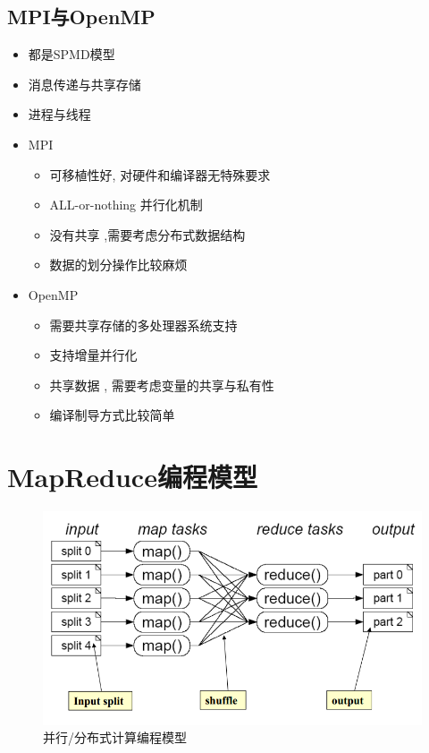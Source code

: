 \documentclass[UTF8,a4paper]{ctexart}
\begin{document}
\subsection{MPI与OpenMP}
\begin{itemize}
  \item 都是SPMD模型
  \item 消息传递与共享存储
  \item 进程与线程
  \item MPI
  \begin{itemize}
    \item 可移植性好, 对硬件和编译器无特殊要求
    \item ALL-or-nothing 并行化机制
    \item 没有共享 ,需要考虑分布式数据结构
    \item 数据的划分操作比较麻烦
  \end{itemize}

  \item OpenMP
  \begin{itemize}
    \item 需要共享存储的多处理器系统支持
    \item 支持增量并行化
    \item 共享数据 , 需要考虑变量的共享与私有性
    \item 编译制导方式比较简单
  \end{itemize}
\end{itemize}


\section{MapReduce编程模型}
\begin{figure}[H]
  \centering
  \includegraphics[scale = 0.3]{assets/ParallelComputing_aa3a7.png}
  \caption{并行/分布式计算编程模型}
\end{figure}
\end{document}
